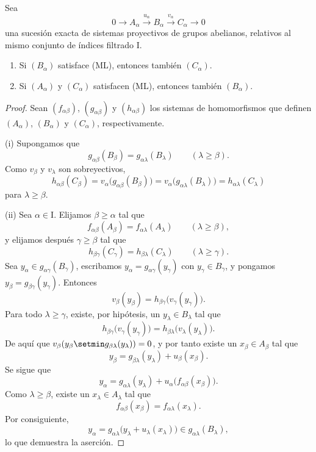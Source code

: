 \documentclass[oneside]{amsart}
\renewcommand{\geq}{\geqslant}
\newcommand{\oldpage}[2][]{{\marginnote{\normalfont\textbf{#1}~|~#2}}\ignorespaces}
\let\EGAOriginalLabel\label
\renewcommand{\label}[1]{\phantomsection\EGAOriginalLabel{#1}}
\begin{document}
\begin{proposition}[13.2.1]
\label{0.13.2.1}
Sea
\[
  0\longrightarrow A_\alpha
  \xrightarrow{u_\alpha}B_\alpha
  \xrightarrow{v_\alpha}C_\alpha
  \longrightarrow0
\]
una sucesión exacta de sistemas proyectivos de grupos abelianos, relativos
al mismo conjunto de índices filtrado $\mathrm{I}$.
\begin{enumerate}
  \item[{\rm(i)}]
  Si $(B_\alpha)$ satisface {\rm(ML)}, entonces también $(C_\alpha)$.
  \item[{\rm(ii)}]
  Si $(A_\alpha)$ y $(C_\alpha)$ satisfacen {\rm(ML)}, entonces también
  $(B_\alpha)$.
\end{enumerate}
\end{proposition}

\begin{proof}
Sean $(f_{\alpha\beta})$, $(g_{\alpha\beta})$ y
$(h_{\alpha\beta})$ los sistemas de homomorfismos que definen
$(A_\alpha)$, $(B_\alpha)$ y $(C_\alpha)$, respectivamente.

(i) Supongamos que
\[
  g_{\alpha\beta}(B_\beta)
  =
  g_{\alpha\lambda}(B_\lambda)
  \qquad(\lambda\geq\beta).
\]
Como $v_\beta$ y $v_\lambda$ son sobreyectivos,
\[
  h_{\alpha\beta}(C_\beta)
  =
  v_\alpha\bigl(g_{\alpha\beta}(B_\beta)\bigr)
  =
  v_\alpha\bigl(g_{\alpha\lambda}(B_\lambda)\bigr)
  =
  h_{\alpha\lambda}(C_\lambda)
\]
para $\lambda\geq\beta$.

(ii) Sea $\alpha\in\mathrm{I}$.
Elijamos $\beta\geq\alpha$ tal que
\[
  f_{\alpha\beta}(A_\beta)
  =
  f_{\alpha\lambda}(A_\lambda)
  \qquad(\lambda\geq\beta),
\]
y elijamos después $\gamma\geq\beta$ tal que
\[
  h_{\beta\gamma}(C_\gamma)
  =
  h_{\beta\lambda}(C_\lambda)
  \qquad(\lambda\geq\gamma).
\]
Sea $y_\alpha\in g_{\alpha\gamma}(B_\gamma)$, escribamos
$y_\alpha=g_{\alpha\gamma}(y_\gamma)$ con $y_\gamma\in B_\gamma$,
y pongamos $y_\beta=g_{\beta\gamma}(y_\gamma)$.
Entonces
\[
  v_\beta(y_\beta)
  =
  h_{\beta\gamma}\bigl(v_\gamma(y_\gamma)\bigr).
\]
Para todo $\lambda\geq\gamma$, existe, por hipótesis, un
$y_\lambda\in B_\lambda$ tal que
\[
  h_{\beta\gamma}\bigl(v_\gamma(y_\gamma)\bigr)
  =
  h_{\beta\lambda}\bigl(v_\lambda(y_\lambda)\bigr).
\]
De aquí que
$v_\beta(y_\beta\setmin g_{\beta\lambda}(y_\lambda))=0$, y por tanto
existe un $x_\beta\in A_\beta$
\oldpage[0\textsubscript{III}]{66}
tal que
\[
  y_\beta
  =
  g_{\beta\lambda}(y_\lambda)+u_\beta(x_\beta).
\]
Se sigue que
\[
  y_\alpha
  =
  g_{\alpha\lambda}(y_\lambda)
  +
  u_\alpha\bigl(f_{\alpha\beta}(x_\beta)\bigr).
\]
Como $\lambda\geq\beta$, existe un $x_\lambda\in A_\lambda$ tal
que
\[
  f_{\alpha\beta}(x_\beta)=f_{\alpha\lambda}(x_\lambda).
\]
Por consiguiente,
\[
  y_\alpha
  =
  g_{\alpha\lambda}
  \bigl(y_\lambda+u_\lambda(x_\lambda)\bigr)
  \in g_{\alpha\lambda}(B_\lambda),
\]
lo que demuestra la aserción.
\end{proof}
\end{document}
